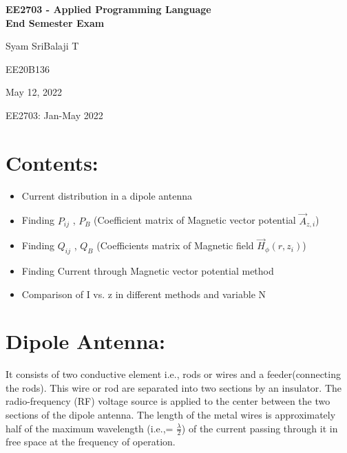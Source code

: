 \documentclass[12pt]{article}
\newcommand\titleofdoc{\Large{\textbf{EE2703 - Applied Programming Language\\End Semester Exam}}}
\begin{document}
\begin{titlepage}
   \begin{center}
        \vspace*{4cm} %

        \Huge{\titleofdoc} 

        \vspace{3 cm}
        \Large{Syam SriBalaji T}
       
        \vspace{0.25cm}
        \large{EE20B136}
       
        \vspace{3 cm}
        \Large{May 12, 2022}
        
        \vspace{0.25 cm}
        \Large{EE2703: Jan-May 2022}
       

       \vfill
    \end{center}
\end{titlepage}

\setcounter{page}{2}
\pagestyle{fancy}
\fancyhf{}
\rhead{\thepage}


\newpage
\section*{\textbf{Contents:}}

\begin{itemize}
  \item Current distribution in a dipole antenna
  \item Finding $P_{ij}$ , $P_{B}$ (Coefficient matrix of Magnetic vector potential $\overrightarrow{A}_{z,i}$)
  \item Finding $Q_{ij}$ , $Q_{B}$ (Coefficients matrix of Magnetic field $\overrightarrow{H}_{\phi}(r,z_{i})$)
  \item Finding Current through Magnetic vector potential method
  \item Comparison of I vs. z in different methods and variable N
\end{itemize}

\section*{Dipole Antenna: }
It consists of two conductive element i.e., rods or wires and a feeder(connecting the rods). This wire or rod are separated into two sections by an insulator. The radio-frequency (RF) voltage source is applied to the center between the two sections of the dipole antenna. The length of the metal wires is approximately half of the maximum wavelength (i.e.,= $\frac{\lambda}{2}$) of the current passing through it in free space at the frequency of operation. 
\end{document}
